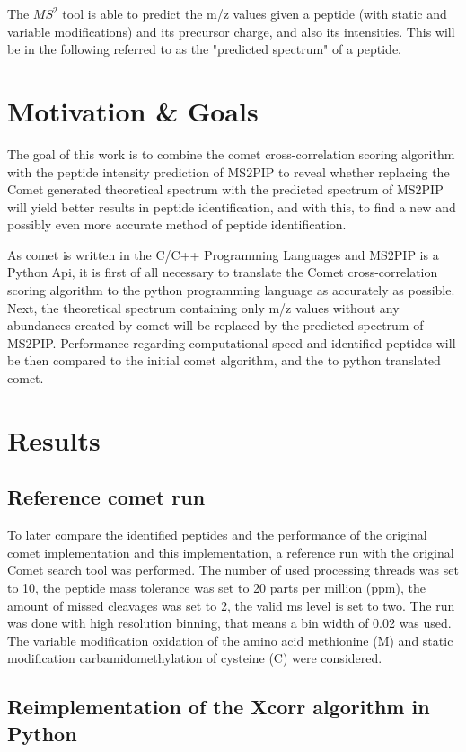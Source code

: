 \documentclass[11pt]{article}
\begin{document}
The \(MS^2\) tool is able to predict the m/z values given a peptide (with static and variable modifications) and its precursor charge, and also its intensities. This will be in the following referred to as the "predicted spectrum" of a peptide.

\section{Motivation \& Goals}
The goal of this work is to combine the comet cross-correlation scoring algorithm
with the peptide intensity prediction of MS2PIP to reveal whether replacing the Comet generated theoretical spectrum with the predicted spectrum of MS2PIP will yield better results in peptide identification, and with this, to find a new and possibly even more accurate method of peptide identification.

As comet is written in the C/C++ Programming Languages and MS2PIP is a Python Api, it is first of all necessary to translate the Comet cross-correlation scoring algorithm to the python programming language as accurately as possible. Next, the theoretical spectrum containing only m/z values without any abundances created by comet will be replaced by the predicted spectrum of MS2PIP. Performance regarding computational speed and identified peptides will be then compared to the initial comet algorithm, and the to python translated comet. 

\section{Results}

\subsection{Reference comet run}
To later compare the identified peptides and the performance of the original comet implementation and this implementation, a reference run with the original Comet search tool was performed. The number of used processing threads was set to 10, the peptide mass tolerance was set to 20 parts per million (ppm), the amount of missed cleavages was set to 2, the valid ms level is set to two. The run was done with high resolution binning, that means a bin width of 0.02 was used. The variable modification oxidation of the amino acid methionine (M) and static modification carbamidomethylation of cysteine (C) were considered.

\subsection{Reimplementation of the Xcorr algorithm in Python}
\end{document}
